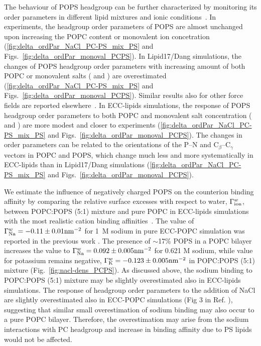 \documentclass[journal=jpcbfk,manuscript=article]{achemso}
\begin{document}
The behaviour of POPS headgroup can be further characterized by monitoring its order parameters in different
lipid mixtures and ionic conditions~\cite{NMRlipidsIV,roux90}.
In experiments, the headgroup order parameters of POPS are almost unchanged upon increasing the POPC content or monovalent ion concetration
(\ref{fig:delta_ordPar_NaCl_PC-PS_mix_PS} and Figs.~\ref{fig:delta_ordPar_monoval_PCPS}).
In Lipid17/Dang simulations, the changes of POPS headgroup order parameters with increasing amount of
both POPC or monovalent salts ( and ) are overestimated (\ref{fig:delta_ordPar_NaCl_PC-PS_mix_PS} and Figs.~\ref{fig:delta_ordPar_monoval_PCPS}).
Similar results also for other force fields are reported elsewhere~\cite{NMRlipidsIV}.
In ECC-lipids simulations, the response of POPS headgroup order parameters to both POPC and monovalent salt concentration ( and )
are more modest and closer to experiments (\ref{fig:delta_ordPar_NaCl_PC-PS_mix_PS} and Figs.~\ref{fig:delta_ordPar_monoval_PCPS}).
The changes in order parameters can be related to the orientations of the P--N and C$_{\beta}$--C$_{\gamma}$
vectors in POPC and POPS, which change much less and more systematically in ECC-lipids
than in Lipid17/Dang simulations (\ref{fig:delta_ordPar_NaCl_PC-PS_mix_PS} and Figs.~\ref{fig:delta_ordPar_monoval_PCPS}). 

We estimate the influence of negatively charged POPS on the counterion binding affinity
by comparing the relative surface excesses with respect to water, $\Gamma ^{w} _{\rm ion}$,
between POPC:POPS (5:1) mixture and pure POPC in ECC-lipids simulations with the most realistic
cation binding affinities~\cite{melcr18}.
The value of $\Gamma ^{w} _{\rm Na}=-0.11 \pm 0.01 \mathrm{nm}^{-2}$ for 1~M sodium in pure ECC-POPC
simulation was reported in the previous work \cite{melcr18}.
The presence of $\sim$17\% POPS in a POPC bilayer increases the
value to $\Gamma ^{w} _{\rm Na}=0.092 \pm 0.005 \mathrm{nm}^{-2}$ 
for 0.621 M sodium, while value for potassium remains negative,
$\Gamma ^{w} _{\rm K}=-0.123 \pm 0.005 \mathrm{nm}^{-2}$ in POPC:POPS (5:1) mixture (Fig.~\ref{fig:nacl-dens_PCPS}).
As discussed above, the sodium binding to POPC:POPS (5:1) mixture may be slightly overestimated also in
ECC-lipids simulations. The response of headgroup order parameters to the addition of NaCl are
slightly overestimated also in ECC-POPC simulations (Fig 3 in Ref. ),
suggesting that similar small overestimation of sodium binding may also occur to a pure POPC bilayer.
Therefore, the overestimation may arise from the sodium interactions with PC headgroup and
increase in binding affinity due to PS lipids would not be affected.
\end{document}
